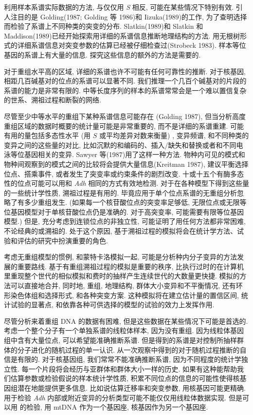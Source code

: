 \documentclass[12pt]{article}
\begin{document}
利用样本系谱实际数据的方法, 与仅仅用 \textit{S} 相反, 可能在某些情况下特别有效. 引人注目的是 Golding(1987; Golding 等
1986)和 Iizuka(1989)的工作, 为了查明选择而检验了系谱上不同种类的突变的分布. Slatkin(1989)和 Slatkin 和
Maddison(1989)已经开始探索用详细的系谱信息推断地理结构的方法.
用无根树形式的详细系谱信息对突变参数的估算已经被仔细检查过(Strobeck 1983). 样本等位基因的系谱上有大量的信息.
探究这些信息的额外的方法是需要的.

对于重组水平高的区域, 详细的系谱也许不可能有任何可靠性的推断. 对于核基因, 相距几百碱基对的位点的系谱可以显著不同.
我们推理一个几百个碱基对的片段的系谱的能力是非常有限的.
中等长度序列的样本的系谱常常会是一个难以置信复杂的世系、溯祖过程和断裂的网络.

尽管至少中等水平的重组下某种系谱信息可能存在 (Golding 1987), 但当分析高度重组区域的数据时概要的统计量可能是非常重要的,
而不是详细的系谱重建. 可能有用的量包括多态性水平 (用 $S$ 或平均差异对数来衡量) , 变异频谱,
和不同种类的变异之间的这些量的对比, 比如沉默的和编码的、插入/缺失和替换或者和不同电泳等位基因相关的变异. Sawyer
等(1987)用了这样一种方法. 物种内可见的模式和物种间观察到的模式之间的比较将会提供大量信息(Kreitman 1987),
建议平衡选择位点、搭乘事件, 或者发生了突变率或约束条件的剧烈改变.
十或十五个有酶多态性的位点可能可以用和 \textit{Adh} 相同的方式有效地检测. 对于在各种模型下得到这些量的一些统计学性质,
溯祖过程是有用的. 毕竟应用于单个位点系谱的无重组分析忽略了有多少重组发生.
(如果每一个核苷酸位点的突变率足够低, 无限位点或无限等位基因模型对于单核苷酸位点仍是准确的.
对于高突变率, 可能需要有限等位基因模型.)
但是, 充分考虑到连锁位点的非独立性, 可能证明了用任何方法都非常困难, 不论经典的或溯祖的.
处于这个原因, 基于溯祖过程的模拟将会在统计学方法、试验和评估的研究中扮演重要的角色.

考虑无重组模型的惯例, 和蒙特卡洛模拟一起, 可能是分析种内分子变异的方法发展的重要路线.
基于有重组溯祖过程的模拟是重要的秩序, 比执行过时的在计算机里重现整个世代的相似模拟和费时的抽样产生连续世代的大数量更快捷.
模拟的方法可以直接地合并, 同时地, 重组, 地理结构, 群体大小变异和不平衡情况, 还有环形染色体组和选择形式, 和各种突变方案.
这种模拟将在建立估计量的置信区间, 统计试验的显著点, 和依靠各种可供选择的模型的试验的效力上发挥作用.

尽管分析来着重组 DNA 的数据有困难, 但是这些数据在某些情况下可能是首选的. 考虑一个整个分子有一个单独系谱的线粒体样本,
因为没有重组. 因为线粒体基因组中含有大量位点, 可以希望能准确推断系谱.
但是得到的系谱是对控制所抽样群体的分子进化的随机过程的单一认识. 从一次观察中得到的对于随机过程推断的自信是有限的.
对于核基因组, 我们常常不能准确推断系谱, 因为不同程度的统计学独立性. 每一个片段将会经历与亚群体和群体大小一样的历史.
如果有这种能帮助我们估算参数或检验假说的样本统计学性质, 积累不同位点的信息的可能性使得核基因组潜在地能提供更多信息.
比如说估算迁移率和突变参数, 用核基因可能更精确.
用于检验 \textit{Adh} 内部或附近变异的分析类型可能不能仅仅用线粒体数据实现.
但是可以用 \textcite{hudson1987} 的检验, 用 mtDNA 作为一个基因座, 核基因作为另一个基因座.
\end{document}
